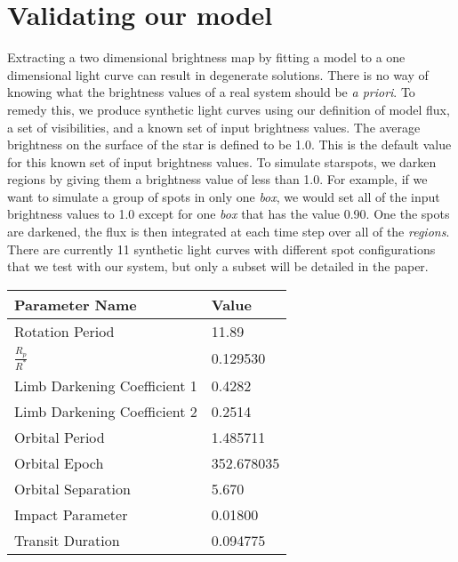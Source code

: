 

\section{Validating our model \label{validation}}


Extracting a two dimensional brightness map by fitting a model to a one dimensional light curve can result in degenerate solutions.  There is no way of knowing what the brightness values of a real system should be {\it a priori}. To remedy this, we produce synthetic light curves using our definition of model flux, a set of visibilities, and a known set of input brightness values. The average brightness on the surface of the star is defined to be 1.0. This is the default value for this known set of input brightness values. To simulate starspots, we darken regions by giving them a brightness value of less than 1.0. For example, if we want to simulate a group of spots in only one {\it box}, we would set all of the input brightness values to 1.0 except for one {\it box} that has the value 0.90. One the spots are darkened, the flux is then integrated at each time step over all of the {\it regions}. There are currently 11 synthetic light curves with different spot configurations that we test with our system, but only a subset will be detailed in the paper.

\begin{table}
\begin{center}
  \begin{tabular}{l | l}
    Parameter Name & Value \\ \hline
    Rotation Period & 11.89\\
	$\frac{R_p}{R^{*}}$ & 0.129530 \\
	Limb Darkening Coefficient 1 & 0.4282\\
	Limb Darkening Coefficient 2 & 0.2514\\
	Orbital Period & 1.485711\\
	Orbital Epoch & 352.678035\\
	Orbital Separation & 5.670\\
	Impact Parameter & 0.01800\\
	Transit Duration & 0.094775\\
  \end{tabular}
\end{center}
\label{models}
\end{table}

